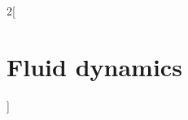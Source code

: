 \documentclass[../../../main_physics.tex]{subfiles}
\begin{document}
\renewcommand{\col}{\phy}
\begin{multicols}{2}[\section{Fluid dynamics}]

\end{multicols}
\end{document}
